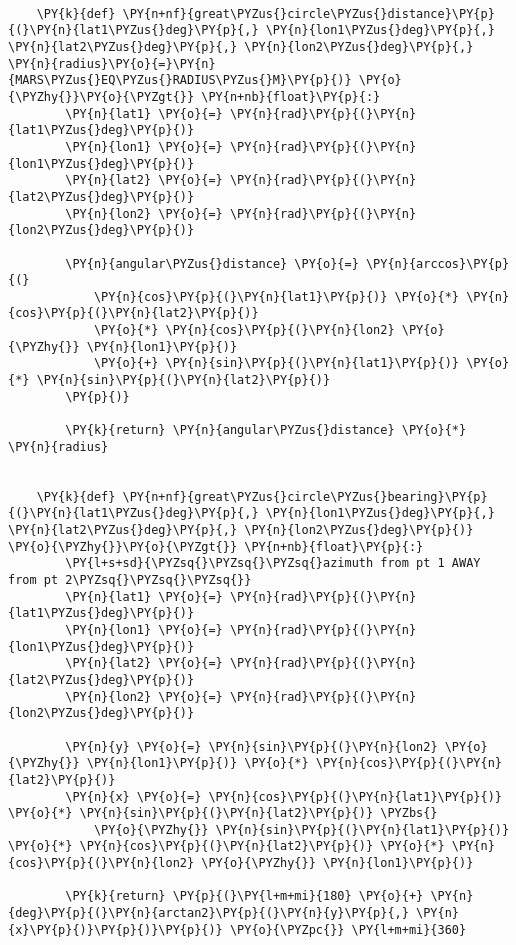 \begin{tcolorbox}[breakable, size=fbox, boxrule=1pt, pad at break*=1mm,colback=cellbackground, colframe=cellborder]
\begin{Verbatim}[commandchars=\\\{\}]
    
    \PY{k}{def} \PY{n+nf}{great\PYZus{}circle\PYZus{}distance}\PY{p}{(}\PY{n}{lat1\PYZus{}deg}\PY{p}{,} \PY{n}{lon1\PYZus{}deg}\PY{p}{,} \PY{n}{lat2\PYZus{}deg}\PY{p}{,} \PY{n}{lon2\PYZus{}deg}\PY{p}{,} \PY{n}{radius}\PY{o}{=}\PY{n}{MARS\PYZus{}EQ\PYZus{}RADIUS\PYZus{}M}\PY{p}{)} \PY{o}{\PYZhy{}}\PY{o}{\PYZgt{}} \PY{n+nb}{float}\PY{p}{:}
        \PY{n}{lat1} \PY{o}{=} \PY{n}{rad}\PY{p}{(}\PY{n}{lat1\PYZus{}deg}\PY{p}{)}
        \PY{n}{lon1} \PY{o}{=} \PY{n}{rad}\PY{p}{(}\PY{n}{lon1\PYZus{}deg}\PY{p}{)}
        \PY{n}{lat2} \PY{o}{=} \PY{n}{rad}\PY{p}{(}\PY{n}{lat2\PYZus{}deg}\PY{p}{)}
        \PY{n}{lon2} \PY{o}{=} \PY{n}{rad}\PY{p}{(}\PY{n}{lon2\PYZus{}deg}\PY{p}{)}
    
        \PY{n}{angular\PYZus{}distance} \PY{o}{=} \PY{n}{arccos}\PY{p}{(}
            \PY{n}{cos}\PY{p}{(}\PY{n}{lat1}\PY{p}{)} \PY{o}{*} \PY{n}{cos}\PY{p}{(}\PY{n}{lat2}\PY{p}{)}
            \PY{o}{*} \PY{n}{cos}\PY{p}{(}\PY{n}{lon2} \PY{o}{\PYZhy{}} \PY{n}{lon1}\PY{p}{)}
            \PY{o}{+} \PY{n}{sin}\PY{p}{(}\PY{n}{lat1}\PY{p}{)} \PY{o}{*} \PY{n}{sin}\PY{p}{(}\PY{n}{lat2}\PY{p}{)}
        \PY{p}{)}
    
        \PY{k}{return} \PY{n}{angular\PYZus{}distance} \PY{o}{*} \PY{n}{radius}
    
    
    \PY{k}{def} \PY{n+nf}{great\PYZus{}circle\PYZus{}bearing}\PY{p}{(}\PY{n}{lat1\PYZus{}deg}\PY{p}{,} \PY{n}{lon1\PYZus{}deg}\PY{p}{,} \PY{n}{lat2\PYZus{}deg}\PY{p}{,} \PY{n}{lon2\PYZus{}deg}\PY{p}{)} \PY{o}{\PYZhy{}}\PY{o}{\PYZgt{}} \PY{n+nb}{float}\PY{p}{:}
        \PY{l+s+sd}{\PYZsq{}\PYZsq{}\PYZsq{}azimuth from pt 1 AWAY from pt 2\PYZsq{}\PYZsq{}\PYZsq{}}
        \PY{n}{lat1} \PY{o}{=} \PY{n}{rad}\PY{p}{(}\PY{n}{lat1\PYZus{}deg}\PY{p}{)}
        \PY{n}{lon1} \PY{o}{=} \PY{n}{rad}\PY{p}{(}\PY{n}{lon1\PYZus{}deg}\PY{p}{)}
        \PY{n}{lat2} \PY{o}{=} \PY{n}{rad}\PY{p}{(}\PY{n}{lat2\PYZus{}deg}\PY{p}{)}
        \PY{n}{lon2} \PY{o}{=} \PY{n}{rad}\PY{p}{(}\PY{n}{lon2\PYZus{}deg}\PY{p}{)}
    
        \PY{n}{y} \PY{o}{=} \PY{n}{sin}\PY{p}{(}\PY{n}{lon2} \PY{o}{\PYZhy{}} \PY{n}{lon1}\PY{p}{)} \PY{o}{*} \PY{n}{cos}\PY{p}{(}\PY{n}{lat2}\PY{p}{)}
        \PY{n}{x} \PY{o}{=} \PY{n}{cos}\PY{p}{(}\PY{n}{lat1}\PY{p}{)} \PY{o}{*} \PY{n}{sin}\PY{p}{(}\PY{n}{lat2}\PY{p}{)} \PYZbs{}
            \PY{o}{\PYZhy{}} \PY{n}{sin}\PY{p}{(}\PY{n}{lat1}\PY{p}{)} \PY{o}{*} \PY{n}{cos}\PY{p}{(}\PY{n}{lat2}\PY{p}{)} \PY{o}{*} \PY{n}{cos}\PY{p}{(}\PY{n}{lon2} \PY{o}{\PYZhy{}} \PY{n}{lon1}\PY{p}{)}
    
        \PY{k}{return} \PY{p}{(}\PY{l+m+mi}{180} \PY{o}{+} \PY{n}{deg}\PY{p}{(}\PY{n}{arctan2}\PY{p}{(}\PY{n}{y}\PY{p}{,} \PY{n}{x}\PY{p}{)}\PY{p}{)}\PY{p}{)} \PY{o}{\PYZpc{}} \PY{l+m+mi}{360}
    

\end{Verbatim}
\end{tcolorbox}
